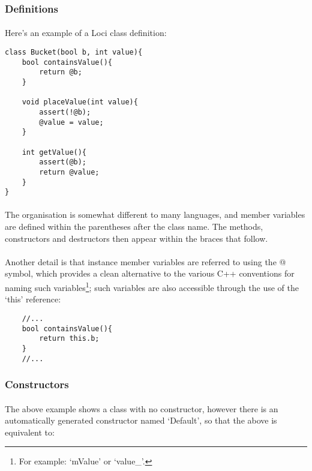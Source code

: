\documentclass[12pt,twoside,notitlepage]{report}
\begin{document}
\subsubsection{Definitions}

\paragraph{}
Here's an example of a Loci class definition:

\small{
\begin{verbatim}
class Bucket(bool b, int value){
    bool containsValue(){
        return @b;
    }
    
    void placeValue(int value){
        assert(!@b);
        @value = value;
    }
    
    int getValue(){
        assert(@b);
        return @value;
    }
}
\end{verbatim}
}

\paragraph{}
The organisation is somewhat different to many languages, and member variables are defined within the parentheses after the class name. The methods, constructors and destructors then appear within the braces that follow.

\paragraph{}
Another detail is that instance member variables are referred to using the @ symbol, which provides a clean alternative to the various C++ conventions for naming such variables\footnote{For example: `mValue' or `value\_'.}; such variables are also accessible through the use of the `this' reference:

\small{
\begin{verbatim}
    //...
    bool containsValue(){
        return this.b;
    }
    //...
\end{verbatim}
}

\subsubsection{Constructors}

\paragraph{}
The above example shows a class with no constructor, however there is an automatically generated constructor named `Default', so that the above is equivalent to:
\end{document}
